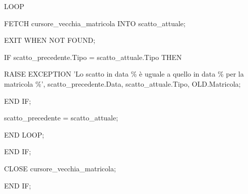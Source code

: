 \begin{flushleft}
\begin{description}
\begin{description}
\begin{description}
\begin{description}
                                \vspace{0.5cm}
                                
                                \item LOOP
                                \begin{description}
                                    \item FETCH cursore\_vecchia\_matricola INTO scatto\_attuale;
                                    \item EXIT WHEN NOT FOUND;
                                    
                                    \vspace{0.5cm}
                                    
                                    \item IF scatto\_precedente.Tipo = scatto\_attuale.Tipo THEN
                                    \begin{description}
                                        \item RAISE EXCEPTION 'Lo scatto in data \% è uguale a quello in data \% per la matricola \%', scatto\_precedente.Data, scatto\_attuale.Tipo, OLD.Matricola;
                                    \end{description}
                                    \item END IF;
                                    
                                    \vspace{0.5cm}
                                    
                                    \item scatto\_precedente = scatto\_attuale; 
                                \end{description}
                                \item END LOOP;
                            \end{description}
                            \item END IF;
                            \item CLOSE cursore\_vecchia\_matricola;
                        \end{description}
                        \item END IF;


\end{description}
\end{description}
\end{flushleft}
